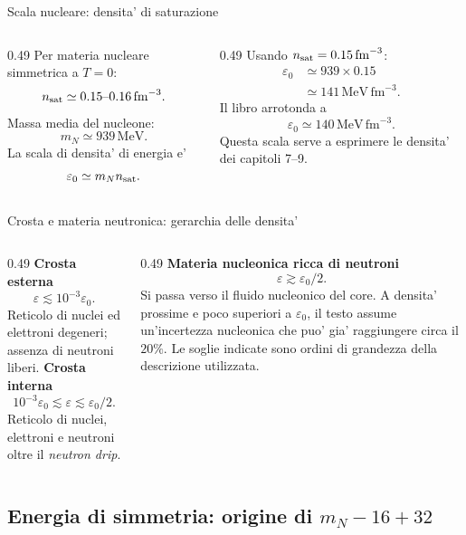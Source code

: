 \begin{frame}{Scala nucleare: densita' di saturazione}
\small
\begin{columns}[T,onlytextwidth]
\begin{column}{0.49\textwidth}
Per materia nucleare simmetrica a $T=0$:
\[
n_{\rm sat}\simeq 0.15\text{--}0.16\,\mathrm{fm}^{-3}.
\]
Massa media del nucleone:
\[
m_N\simeq 939\,\mathrm{MeV}.
\]
La scala di densita' di energia e'
\[
\varepsilon_0\simeq m_N n_{\rm sat}.
\]
\end{column}
\begin{column}{0.49\textwidth}
Usando $n_{\rm sat}=0.15\,\mathrm{fm}^{-3}$:
\[
\begin{aligned}
\varepsilon_0&\simeq 939\times0.15\\
&\simeq 141\,\mathrm{MeV\,fm}^{-3}.
\end{aligned}
\]
Il libro arrotonda a
\[
\varepsilon_0\simeq140\,\mathrm{MeV\,fm}^{-3}.
\]
Questa scala serve a esprimere le densita' dei capitoli 7--9.
\end{column}
\end{columns}
\end{frame}

\begin{frame}{Crosta e materia neutronica: gerarchia delle densita'}
\footnotesize
\begin{columns}[T,onlytextwidth]
\begin{column}{0.49\textwidth}
\textbf{Crosta esterna}
\[
\varepsilon\lesssim10^{-3}\varepsilon_0.
\]
Reticolo di nuclei ed elettroni degeneri; assenza di neutroni liberi.
\medskip
\textbf{Crosta interna}
\[
10^{-3}\varepsilon_0\lesssim\varepsilon
\lesssim\varepsilon_0/2.
\]
Reticolo di nuclei, elettroni e neutroni oltre il \emph{neutron drip}.
\end{column}
\begin{column}{0.49\textwidth}
\textbf{Materia nucleonica ricca di neutroni}
\[
\varepsilon\gtrsim\varepsilon_0/2.
\]
Si passa verso il fluido nucleonico del core.
\medskip
A densita' prossime e poco superiori a $\varepsilon_0$, il testo assume un'incertezza nucleonica che puo' gia' raggiungere circa il $20\%$.
\medskip
Le soglie indicate sono ordini di grandezza della descrizione utilizzata.
\end{column}
\end{columns}
\end{frame}

\subsection{Energia di simmetria: origine di $m_N-16+32$}

